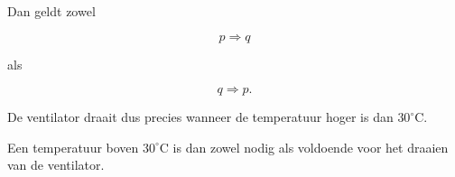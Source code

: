 \documentclass{ximera}
\begin{document}
\begin{oefening}{\oefG}
\begin{question}
\begin{oplossing}
Dan geldt zowel

\[
p\Rightarrow q
\]

als

\[
q\Rightarrow p.
\]

De ventilator draait dus precies wanneer de temperatuur hoger is dan
$30^\circ\mathrm{C}$.

Een temperatuur boven $30^\circ\mathrm{C}$ is dan zowel nodig als
voldoende voor het draaien van de ventilator.

\end{oplossing}

\end{question}

\end{oefening}


\end{document}
